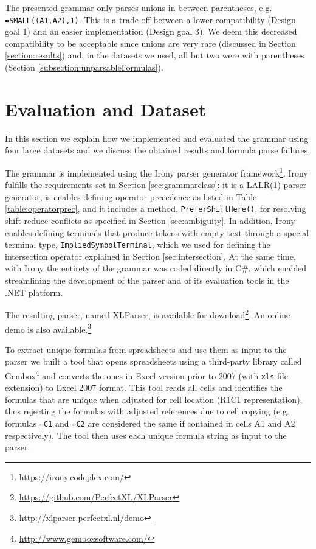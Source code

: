 \documentclass[times]{smrauth}
\begin{document}
The presented grammar only parses unions in between parentheses, e.g. \texttt{=SMALL((A1,A2),1)}.
This is a trade-off between a lower compatibility (Design goal 1) and an easier implementation (Design goal 3).
We deem this decreased compatibility to be acceptable since unions are very rare (discussed in Section \ref{section:results}) and, in the datasets we used, all but two were with parentheses (Section \ref{subsection:unparsableFormulas}).

\section{Evaluation and Dataset}
\label{sec:evaluation}

In this section we explain how we implemented and evaluated the grammar using four large datasets and we discuss the obtained results and formula parse failures.

The grammar is implemented using the Irony parser generator framework\footnote{\url{https://irony.codeplex.com/}}. Irony fulfills the requirements set in Section \ref{sec:grammarclass}: it is a LALR(1) parser generator, is enables defining operator precedence as listed in Table \ref{table:operatorprec}, and it includes a method, \texttt{PreferShiftHere()}, for resolving shift-reduce conflicts as specified in Section \ref{sec:ambiguity}. In addition, Irony enables defining terminals that produce tokens with empty text through a special terminal type, \texttt{ImpliedSymbolTerminal}, which we used for defining the intersection operator explained in Section \ref{sec:intersection}. At the same time, with Irony the entirety of the grammar was coded directly in C\#, which enabled streamlining the development of the parser and of its evaluation tools in the .NET platform.

The resulting parser, named XLParser, is available for download\footnote{\url{https://github.com/PerfectXL/XLParser}}. An online demo is also available.\footnote{\url{http://xlparser.perfectxl.nl/demo}}

To extract unique formulas from spreadsheets and use them as input to the parser we built a tool that opens spreadsheets using a third-party library called Gembox\footnote{\url{http://www.gemboxsoftware.com/}} and converts the ones in Excel version prior to 2007 (with \texttt{xls} file extension) to Excel 2007 format. This tool reads all cells and identifies the formulas that are unique when adjusted for cell location (R1C1 representation), thus rejecting the formulas with adjusted references due to cell copying (e.g. formulas \texttt{=C1} and \texttt{=C2} are considered the same if contained in cells A1 and A2 respectively). The tool then uses each unique formula string as input to the parser.
\end{document}
